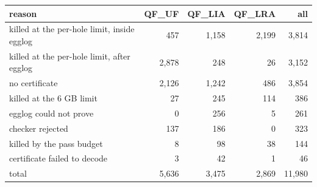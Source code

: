 \begin{tabular}{p{6.4cm}rrrr}
\toprule
reason & QF\_UF & QF\_LIA & QF\_LRA & all \\
\midrule
killed at the per-hole limit, inside egglog & 457 & 1,158 & 2,199 & 3,814 \\
killed at the per-hole limit, after egglog & 2,878 & 248 & 26 & 3,152 \\
no certificate & 2,126 & 1,242 & 486 & 3,854 \\
killed at the 6 GB limit & 27 & 245 & 114 & 386 \\
egglog could not prove & 0 & 256 & 5 & 261 \\
checker rejected & 137 & 186 & 0 & 323 \\
killed by the pass budget & 8 & 98 & 38 & 144 \\
certificate failed to decode & 3 & 42 & 1 & 46 \\
\midrule
total & 5,636 & 3,475 & 2,869 & 11,980 \\
\bottomrule
\end{tabular}

